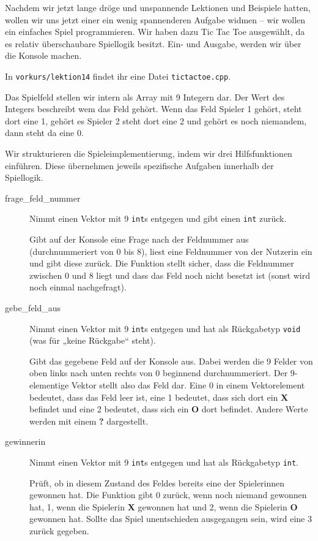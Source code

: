
Nachdem wir jetzt lange dröge und unspannende Lektionen und Beispiele hatten, wollen wir uns jetzt einer
ein wenig spannenderen Aufgabe widmen -- wir wollen ein
einfaches Spiel programmieren. Wir haben dazu Tic Tac Toe ausgewählt, da es
relativ überschaubare Spiellogik besitzt. Ein- und Ausgabe, werden wir über die
Konsole machen.

In \texttt{vorkurs/lektion14} findet ihr eine Datei \texttt{tictactoe.cpp}. 

Das Spielfeld stellen wir intern als Array mit 9 Integern dar. Der Wert des Integers beschreibt wem das Feld gehört. 
Wenn das Feld Spieler 1 gehört, steht dort eine 1, gehört es Spieler 2 steht dort eine 2 und gehört es noch niemandem, 
dann steht da eine 0.

Wir strukturieren die Spieleimplementierung, indem wir drei Hilfsfunktionen einführen. Diese übernehmen jeweils spezifische Aufgaben innerhalb der Spiellogik.

\begin{description}
	\item[frage\_feld\_nummer]
	      Nimmt einen Vektor mit 9 \texttt{int}s entgegen und gibt einen \texttt{int} zurück.

	      Gibt auf der Konsole eine Frage nach der Feldnummer aus (durchnummeriert von 0 bis 8), liest eine Feldnummer von der Nutzerin ein und gibt diese zurück.
	      Die Funktion stellt sicher, dass die Feldnummer zwischen 0 und 8 liegt und dass das Feld noch nicht besetzt ist (sonst wird noch einmal nachgefragt).
	\item[gebe\_feld\_aus]
	      Nimmt einen Vektor mit 9 \texttt{int}s entgegen und hat als Rückgabetyp \texttt{void} (was für „keine Rückgabe“ steht).

	      Gibt das gegebene Feld auf der Konsole aus. Dabei werden die 9 Felder von oben links nach unten rechts von 0 beginnend durchnummeriert.
	      Der 9-elementige Vektor stellt also das Feld dar.
	      Eine 0 in einem Vektorelement bedeutet, dass das Feld leer ist, eine 1 bedeutet, dass sich dort ein \textbf{X} befindet und eine 2 bedeutet, dass sich ein \textbf{O} dort befindet.
	      Andere Werte werden mit einem \textbf{?} dargestellt.
	\item[gewinnerin]
	      Nimmt einen Vektor mit 9 \texttt{int}s entgegen und hat als Rückgabetyp \texttt{int}.

	      Prüft, ob in diesem Zustand des Feldes bereits eine der Spielerinnen gewonnen hat.
	      Die Funktion gibt 0 zurück, wenn noch niemand gewonnen hat, 1, wenn die Spielerin \textbf{X} gewonnen hat und 2, wenn die Spielerin \textbf{O} gewonnen hat.
	      Sollte das Spiel unentschieden ausgegangen sein, wird eine 3 zurück gegeben.
\end{description}



